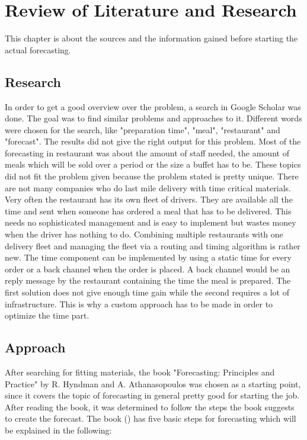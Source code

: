 \renewcommand{\thepage}{\arabic{page}}
\chapter{Review of Literature and Research}\label{chapter:Review of Literature and Research}
This chapter is about the sources and the information gained before starting the actual forecasting.
\section{Research}\label{section:Research}
In order to get a good overview over the problem, a search in Google Scholar was done. The goal was to find similar problems and approaches to it. Different words were chosen for the search, like "preparation time", "meal", "restaurant" and "forecast". The results did not give the right output for this problem. Most of the forecasting in restaurant was about the amount of staff needed, the amount of meals which will be sold over a period or the size a buffet has to
be. These topics did not fit the problem given because the problem stated is pretty unique. There are not many companies who do last mile delivery with time critical materials. Very often the restaurant has its own fleet of drivers. They are available all the time and sent when someone has ordered a meal that has to be delivered. This needs no sophisticated management  and is easy to implement but wastes money when the driver has nothing to do. Combining multiple restaurants with one delivery fleet and managing the fleet via a routing and timing algorithm is rather new. The time component can be implemented by using a static time for every order or a back channel when the order is placed. A back channel would be an reply message by the restaurant containing the time the meal is prepared. The first solution does not give enough time gain while the second requires a lot of infrastructure. This is why a custom approach has to be made in order to optimize the time part.
\section{Approach}\label{section:Approach and Basics}
After searching for fitting materials, the book "Forecasting: Principles and Practice" by R. Hyndman and A. Athanasopoulos was chosen as a starting point, since it covers the topic of forecasting in general pretty good for starting the job. After reading the book, it was determined to follow the steps the book suggests to create the forecast. The book (\cite{Hyndman.2013}) has five basic steps for forecasting which will be explained in the following:

